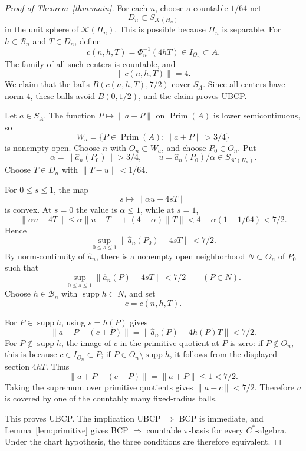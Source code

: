 \documentclass[11pt]{article}
\newcommand{\Kcal}{\mathcal K}
\newcommand{\Prim}{\operatorname{Prim}}
\newcommand{\supp}{\operatorname{supp}}
\begin{document}
\begin{proof}[Proof of Theorem~\ref{thm:main}]
For each \(n\), choose a countable \(1/64\)-net
\[
        D_n\subset S_{\Kcal(H_n)}
\]
in the unit sphere of \(\Kcal(H_n)\).  This is possible because \(H_n\) is
separable.  For \(h\in\mathcal B_n\) and \(T\in D_n\), define
\[
        c(n,h,T)=\Phi_n^{-1}(4hT)\in I_{O_n}\subset A.
\]
The family of all such centers is countable, and
\[
        \|c(n,h,T)\|=4.
\]
We claim that the balls \(B(c(n,h,T),7/2)\) cover \(S_A\).  Since all centers
have norm \(4\), these balls avoid \(B(0,1/2)\), and the claim proves UBCP.

Let \(a\in S_A\).  The function \(P\mapsto \|a+P\|\) on \(\Prim(A)\) is lower
semicontinuous, so
\[
        W_a=\{P\in\Prim(A):\|a+P\|>3/4\}
\]
is nonempty open.  Choose \(n\) with \(O_n\subset W_a\), and choose
\(P_0\in O_n\).  Put
\[
        \alpha=\|\widehat a_n(P_0)\|>3/4,\qquad
        u=\widehat a_n(P_0)/\alpha\in S_{\Kcal(H_n)}.
\]
Choose \(T\in D_n\) with \(\|T-u\|<1/64\).

For \(0\le s\le1\), the map
\[
        s\mapsto \|\alpha u-4sT\|
\]
is convex.  At \(s=0\) the value is \(\alpha\le1\), while at \(s=1\),
\[
        \|\alpha u-4T\|
        \le \alpha\|u-T\|+(4-\alpha)\|T\|
        < 4-\alpha(1-1/64)
        < 7/2.
\]
Hence
\[
        \sup_{0\le s\le1}\|\widehat a_n(P_0)-4sT\|<7/2.
\]
By norm-continuity of \(\widehat a_n\), there is a nonempty open neighborhood
\(N\subset O_n\) of \(P_0\) such that
\[
        \sup_{0\le s\le1}\|\widehat a_n(P)-4sT\|<7/2
        \qquad(P\in N).
\]
Choose \(h\in\mathcal B_n\) with \(\supp h\subset N\), and set
\[
        c=c(n,h,T).
\]

For \(P\in\supp h\), using \(s=h(P)\) gives
\[
        \|a+P-(c+P)\|
        =
        \|\widehat a_n(P)-4h(P)T\|
        <7/2.
\]
For \(P\notin\supp h\), the image of \(c\) in the primitive quotient at \(P\)
is zero: if \(P\notin O_n\), this is because \(c\in I_{O_n}\subset P\); if
\(P\in O_n\setminus\supp h\), it follows from the displayed section
\(4hT\).  Thus
\[
        \|a+P-(c+P)\|=\|a+P\|\le1<7/2.
\]
Taking the supremum over primitive quotients gives \(\|a-c\|<7/2\).
Therefore \(a\) is covered by one of the countably many fixed-radius balls.

This proves UBCP.  The implication UBCP \(\Rightarrow\) BCP is immediate, and
Lemma~\ref{lem:primitive} gives BCP \(\Rightarrow\) countable \(\pi\)-basis
for every \(C^*\)-algebra.  Under the chart hypothesis, the three conditions
are therefore equivalent.
\end{proof}
\end{document}
